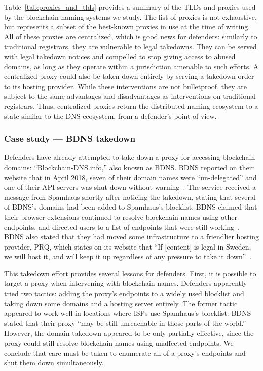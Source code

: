 Table~\ref{tab:proxies_and_tlds} provides a summary of the TLDs and 
proxies 
used by the blockchain naming systems we study. The list of proxies is not 
exhaustive, but 
represents 
a subset of the best-known proxies in use at the time of writing.
All of these proxies are 
centralized, which is good news for defenders: similarly to traditional 
registrars, they are vulnerable to legal takedowns. They can be served with 
legal takedown notices and compelled to stop giving access to abused domains, 
as long as they 
operate within a jurisdiction amenable to such efforts. A centralized proxy 
could also be taken 
down entirely by serving a takedown order to its hosting provider. While 
these interventions are 
not bulletproof, they are subject to the same advantages and disadvantages 
as 
interventions on traditional registrars. Thus, centralized proxies return 
the 
distributed naming ecosystem to a state similar to the DNS ecosystem, from a 
defender's point of view. 

\subsubsection{Case study --- BDNS takedown}
Defenders have already attempted to take down a proxy for 
accessing blockchain domains: ``Blockchain-DNS.info,'' also 
known as BDNS. BDNS reported on their website that in April 
2018, seven of their domain names were ``un-delegated'' and 
one of their API servers was shut down without 
warning~\cite{blockchain-dns-info-wayback}. The service 
received a message from Spamhaus shortly after noticing the 
takedown, stating that several of 
BDNS's domains had been added to Spamhaus's blocklist. BDNS 
claimed that their browser extensions continued to resolve 
blockchain names using other endpoints, and directed users to 
a list of endpoints that were still 
working~\cite{github_bdns_wayback}. BDNS also stated that 
they had moved some infrastructure to a friendlier hosting 
provider, PRQ, which states on its website that ``If 
[content] is legal in Sweden, we will host it, and will keep 
it up regardless of any pressure to take it 
down''~\cite{prq}. 

This takedown effort provides several lessons for defenders. 
First, it is possible to target a proxy when intervening with 
blockchain names. Defenders apparently tried two tactics: 
adding the proxy's endpoints to a widely used blocklist and 
taking down some domains and a hosting server entirely. 
The former tactic appeared to work well in locations where 
ISPs use Spamhaus's blocklist: BDNS stated that their 
proxy ``may be still unreachable in those parts of the 
world.'' However, the domain takedown appeared to be only 
partially effective, since the proxy could still resolve 
blockchain names using unaffected endpoints. We conclude that 
care must be taken to enumerate all of a proxy's endpoints 
and shut them down simultaneously.  

